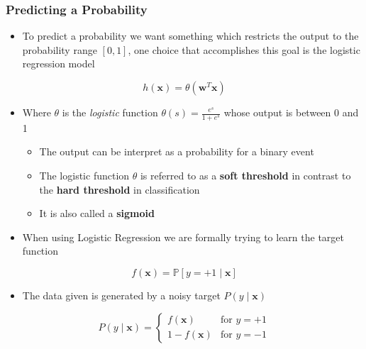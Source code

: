 \documentclass[11pt]{article}
\begin{document}
\subsubsection{Predicting a Probability}
\label{sec:org6f539c7}
\begin{itemize}
\item To predict a probability we want something which restricts the output to the probability range \([0,1]\), one choice that accomplishes this goal is the logistic regression model
\end{itemize}
\begin{equation}
    h(\pmb x) = \theta(\pmb w^T \pmb x)
\end{equation}
\begin{itemize}
\item Where \(\theta\) is the \emph{logistic} function \(\theta(s) = \frac{e^s}{1+e^s}\) whose output is between 0 and 1
\begin{itemize}
\item The output can be interpret as a probability for a binary event
\item The logistic function \(\theta\) is referred to as a \textbf{soft threshold} in contrast to the \textbf{hard threshold} in classification
\item It is also called a \textbf{sigmoid}
\end{itemize}

\item When using Logistic Regression we are formally trying to learn the target function
\end{itemize}
\begin{equation}
  f(\pmb x) = \mathbb P [y=+1 \mid \pmb x]
\end{equation}

\begin{itemize}
\item The data given is generated by a noisy target \(P(y \mid \pmb x)\)
\end{itemize}
\begin{equation}
  \begin{equation*}
    P(y \mid \pmb x) = 
  		\begin{cases}
  			\mbox{$f(\pmb x)$} & \mbox{for $y=+1$} \\
  			\mbox{$1-f(\pmb x)$} & \mbox{for $y=-1$} 
  		\end{cases}
  \end{equation*}    
\end{equation}
\end{document}
